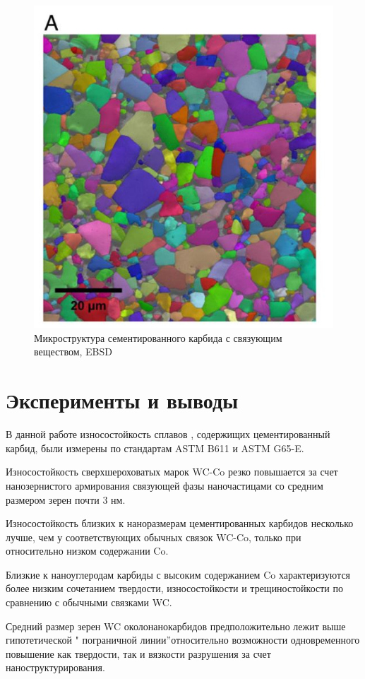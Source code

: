 \documentclass[a4paper, 14pt]{article}
\begin{document}
	\begin{figure}[h!]
	\centering
	\includegraphics[scale=0.65]{images/зерна1}
	\caption{Микроструктура сементированного карбида с связующим веществом, EBSD}
	\end{figure}

	\section{Эксперименты и выводы}
	В данной работе износостойкость сплавов , содержищих цементированный карбид, 
    были измерены по стандартам
	ASTM B611 и ASTM G65-E.
	
	Износостойкость сверхшероховатых марок WC-Co резко
	повышается за счет нанозернистого армирования связующей фазы
	наночастицами со средним размером зерен почти 3 нм. 

	Износостойкость близких к наноразмерам цементированных карбидов несколько лучше,
	чем у соответствующих обычных связок WC-Co, только при
	относительно низком содержании Co.
	
	Близкие к наноуглеродам карбиды
	с высоким содержанием Co характеризуются более низким сочетанием твердости, износостойкости и
	трещиностойкости по сравнению с обычными связками WC.
	
	
	Средний размер зерен WC околонанокарбидов предположительно лежит
	выше гипотетической " пограничной линии”относительно возможности одновременного
	повышение как твердости, так и вязкости разрушения за счет
	наноструктурирования.
	
	

	
\end{document}
